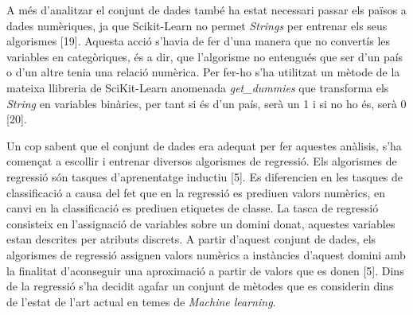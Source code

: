 \documentclass[10pt,a4paper,twocolumn,twoside]{article}
\begin{document}
A més d'analitzar el conjunt de dades també ha estat necessari passar els països a dades numèriques, ja que Scikit-Learn no permet \textit{Strings} per entrenar els seus algorismes [19]. Aquesta acció s'havia de fer d'una manera que no convertís les variables en categòriques, és a dir, que l'algorisme no entengués que ser d'un país o d'un altre tenia una relació numèrica. Per fer-ho s'ha utilitzat un mètode de la mateixa llibreria de SciKit-Learn anomenada \textit{get\_dummies} que transforma els \textit{String} en variables binàries, per tant si és d'un país, serà un 1 i si no ho és, serà 0 [20].

Un cop sabent que el conjunt de dades era adequat per fer aquestes anàlisis, s'ha començat a escollir i entrenar diversos algorismes de regressió. Els algorismes de regressió són tasques d'aprenentatge inductiu [5]. Es diferencien en les tasques de classificació a causa del fet que en la regressió es prediuen valors numèrics, en canvi en la classificació es prediuen etiquetes de classe. La tasca de regressió consisteix en l'assignació de variables sobre un domini donat, aquestes variables estan descrites per atributs discrets. A partir d'aquest conjunt de dades, els algorismes de regressió assignen valors numèrics a instàncies d'aquest domini amb la finalitat d'aconseguir una aproximació a partir de valors que es donen [5]. Dins de la regressió s'ha decidit agafar un conjunt de mètodes que es considerin dins de l'estat de l'art actual en temes de \textit{Machine learning}.
\end{document}
